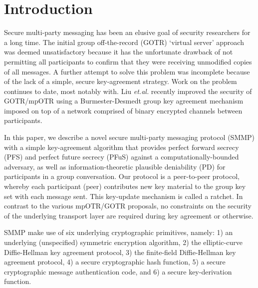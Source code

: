 \documentclass[%
preprint,
amsmath,amssymb,
aps,
prb,
floatfix,
]{revtex4-1}
\begin{document}
\section{\label{sec:Introduction}Introduction}
Secure multi-party messaging has been an elusive goal of security researchers
for a long time. The initial group off-the-record (GOTR) `virtual server'
approach\cite{ref:bian} was deemed unsatisfactory
because it has the unfortunate drawback of not permitting all participants to
confirm that they were receiving unmodified copies of all messages.
A further attempt to solve this problem\cite{ref:goldberg} was incomplete
because of the lack of a simple, secure key-agreement
strategy. Work on the problem
continues to date, most notably with\cite{ref:cryptocat}.
Liu \textit{et.al.}\cite{ref:liu}
recently improved the security of GOTR/mpOTR using a Burmester-Desmedt group
key agreement mechanism imposed on top of a network comprised of binary
encrypted channels between participants.

In this paper, we describe a novel secure multi-party messaging protocol (SMMP) with a
simple key-agreement algorithm that provides perfect forward secrecy (PFS) and
perfect future secrecy (PFuS) against a computationally-bounded adversary,
as well as information-theoretic plausible deniability (PD) for participants
in a group conversation. Our protocol
is a peer-to-peer protocol, whereby each participant (peer) contributes new
key material to the group key set with each message sent.
This key-update mechanism is called a ratchet.
In contrast to the various mpOTR/GOTR proposals, no constraints on the security
of the underlying transport layer are required during key agreement or otherwise.

SMMP make use of six underlying cryptographic primitives, namely: 1) an
underlying (unspecified) symmetric encryption algorithm, 2) the elliptic-curve
Diffie-Hellman key agreement protocol, 3) the finite-field Diffie-Hellman key
agreement protocol, 4) a secure cryptographic hash function, 5) a secure
cryptographic message authentication code, and 6) a secure key-derivation
function.
\end{document}
